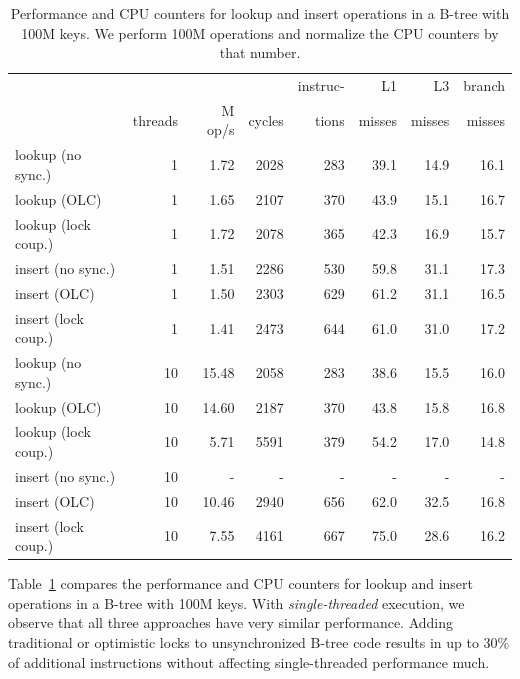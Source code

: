 \documentclass[11pt]{article}
\begin{document}
\begin{table}
  \caption{Performance and CPU counters for lookup and insert operations in a B-tree with 100M keys. We perform 100M operations and normalize the CPU counters by that number.}
  \label{tab:overhead}
  \centering
  \begin{tabular}{lrrrrrrr}\toprule
                    &         &        &        & instruc-  & L1     & L3     & branch \\
                    & threads & M op/s & cycles & tions & misses & misses & misses \\\midrule
lookup (no sync.)   & 1       & 1.72   & 2028   & 283     & 39.1   & 14.9   & 16.1   \\
lookup (OLC)        & 1       & 1.65   & 2107   & 370     & 43.9   & 15.1   & 16.7   \\
lookup (lock coup.) & 1       & 1.72   & 2078   & 365     & 42.3   & 16.9   & 15.7   \\\midrule
insert (no sync.)   & 1       & 1.51   & 2286   & 530     & 59.8   & 31.1   & 17.3   \\
insert (OLC)        & 1       & 1.50   & 2303   & 629     & 61.2   & 31.1   & 16.5   \\
insert (lock coup.) & 1       & 1.41   & 2473   & 644     & 61.0   & 31.0   & 17.2   \\\midrule
lookup (no sync.)   & 10      & 15.48  & 2058   & 283     & 38.6   & 15.5   & 16.0   \\
lookup (OLC)        & 10      & 14.60  & 2187   & 370     & 43.8   & 15.8   & 16.8   \\
lookup (lock coup.) & 10      & 5.71   & 5591   & 379     & 54.2   & 17.0   & 14.8   \\\midrule
insert (no sync.)   & 10      & -      & -      & -       & -      & -      & -      \\
insert (OLC)        & 10      & 10.46  & 2940   & 656     & 62.0   & 32.5   & 16.8   \\
insert (lock coup.) & 10      & 7.55   & 4161   & 667     & 75.0   & 28.6   & 16.2   \\
    \bottomrule
\end{tabular}
\end{table}

Table~\ref{tab:overhead} compares the performance and CPU counters for lookup and insert operations in a B-tree with 100M keys.
With {\em single-threaded} execution, we observe that all three approaches have very similar performance.
Adding traditional or optimistic locks to unsynchronized B-tree code results in up to 30\% of additional instructions without affecting single-threaded performance much.
\end{document}
